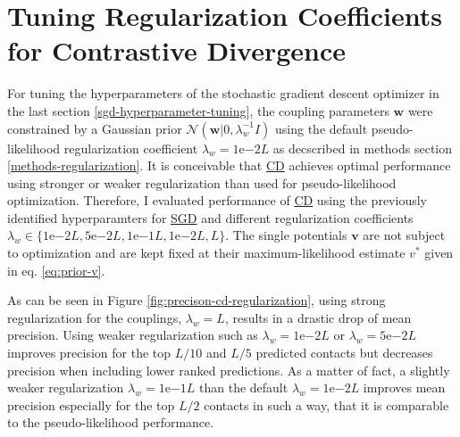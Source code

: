 \documentclass[11pt,a4paper,twoside]{book}
\newcommand{\eq}{\!=\!}
\renewcommand{\v}{\mathbf{v}}
\newcommand{\w}{\mathbf{w}}
\theoremstyle{definition}
\theoremstyle{definition}
\theoremstyle{remark}
\begin{document}
\section{Tuning Regularization Coefficients for Contrastive
Divergence}\label{regularization-for-cd-with-sgd}

For tuning the hyperparameters of the stochastic gradient descent
optimizer in the last section \ref{sgd-hyperparameter-tuning}, the
coupling parameters \(\w\) were constrained by a Gaussian prior
\(\mathcal{N}(\w | 0, \lambda_w^{-1} I)\) using the default
pseudo-likelihood regularization coefficient
\(\lambda_w \eq 1\mathrm{e}{-2}L\) as decscribed in methods section
\ref{methods-regularization}. It is conceivable that
\protect\hyperlink{abbrev}{CD} achieves optimal performance using
stronger or weaker regularization than used for pseudo-likelihood
optimization. Therefore, I evaluated performance of
\protect\hyperlink{abbrev}{CD} using the previously identified
hyperparamters for \protect\hyperlink{abbrev}{SGD} and different
regularization coefficients
\(\lambda_w \in \{ 1\mathrm{e}{-2}L, 5\mathrm{e}{-2}L, 1\mathrm{e}{-1}L, 1\mathrm{e}{-2}L, L\}\).
The single potentials \(\v\) are not subject to optimization and are
kept fixed at their maximum-likelihood estimate \(v^*\) given in eq.
\eqref{eq:prior-v}.

As can be seen in Figure \ref{fig:precison-cd-regularization}, using
strong regularization for the couplings, \(\lambda_w \eq L\), results in
a drastic drop of mean precision. Using weaker regularization such as
\(\lambda_w \eq 1\mathrm{e}{-2}L\) or \(\lambda_w \eq \mathrm{5e}{-2}L\)
improves precision for the top \(L/10\) and \(L/5\) predicted contacts
but decreases precision when including lower ranked predictions. As a
matter of fact, a slightly weaker regularization
\(\lambda_w \eq \mathrm{1e}{-1}L\) than the default
\(\lambda_w \eq \mathrm{1e}{-2}L\) improves mean precision especially
for the top \(L/2\) contacts in such a way, that it is comparable to the
pseudo-likelihood performance.
\end{document}
